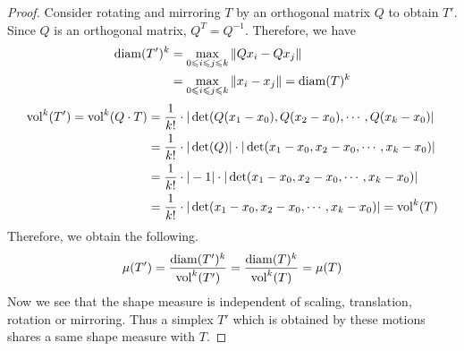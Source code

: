 \begin{proof}
    Consider rotating and mirroring $T$ by an orthogonal matrix $Q$ to obtain $T'$. Since $Q$ is an orthogonal matrix, $Q^T = Q^{-1}$. Therefore, we have
    \begin{align*}
    \operatorname{diam}(T')^k &= \max_{0\leqslant i\leqslant j\leqslant k} \|Qx_i - Qx_j\|\\
               &= \max_{0\leqslant i\leqslant j\leqslant k} \|x_i - x_j\| = \operatorname{diam}(T)^k
    \end{align*}
    \begin{align*}
    \operatorname{vol}^k(T') = \operatorname{vol}^k(Q\cdot T) &= \frac{1}{k!}\cdot |\det(Q(x_1-x_0), Q(x_2-x_0),\cdots, Q(x_k-x_0)|\\
                                &= \frac{1}{k!}\cdot|\det(Q)|\cdot|\det(x_1-x_0, x_2-x_0, \cdots, x_k-x_0)|\\
                                &= \frac{1}{k!}\cdot|-1|\cdot|\det(x_1-x_0, x_2-x_0, \cdots, x_k-x_0)|\\
                                &= \frac{1}{k!}\cdot|\det(x_1-x_0, x_2-x_0, \cdots, x_k-x_0)| = \operatorname{vol}^k(T)
    \end{align*}
    Therefore, we obtain the following.
    \begin{gather*}
    \mu(T') = \frac{\operatorname{diam}(T')^k}{\operatorname{vol}^k(T')} = \frac{\operatorname{diam}(T)^k}{\operatorname{vol}^k(T)} = \mu(T)
    \end{gather*}
    Now we see that the shape measure is independent of scaling, translation, rotation or mirroring. Thus a simplex $T'$ which is obtained by these motions shares a same shape measure with $T$.
    \end{proof}